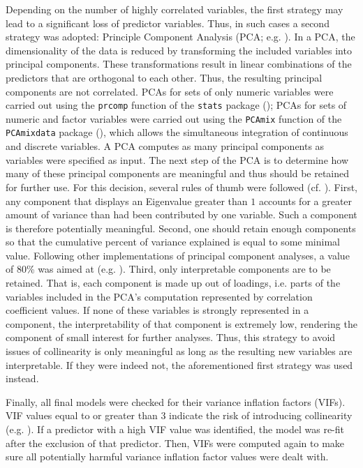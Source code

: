 Depending on the number of highly correlated variables, the first strategy may lead to a significant loss of predictor variables. Thus, in such cases a second strategy was adopted: Principle Component Analysis (PCA; e.g. \cite{Venables2002, Baayen2008, Tomaschek2018collin}). In a PCA, the dimensionality of the data is reduced by transforming the included variables into principal components. These transformations result in linear combinations of the predictors that are orthogonal to each other. Thus, the resulting principal components are not correlated. PCAs for sets of only numeric variables were carried out using the \texttt{prcomp} function of the \texttt{stats} package (\cite{RCore2020}); PCAs for sets of numeric and factor variables were carried out using the \texttt{PCAmix} function of the \texttt{PCAmixdata} package (\cite{Chavent2017}), which allows the simultaneous integration of continuous and discrete variables. A PCA computes as many principal components as variables were specified as input. The next step of the PCA is to determine how many of these principal components are meaningful and thus should be retained for further use. For this decision, several rules of thumb were followed (cf. \cite{ORourke2005, Baayen2008}). First, any component that displays an Eigenvalue greater than $1$ accounts for a greater amount of variance than had been contributed by one variable. Such a component is therefore potentially meaningful. Second, one should retain enough components so that the cumulative percent of variance explained is equal to some minimal value. Following other implementations of principal component analyses, a value of 80\% was aimed at (e.g. \cite{ORourke2005}). Third, only interpretable components are to be retained. That is, each component is made up out of loadings, i.e. parts of the variables included in the PCA’s computation represented by correlation coefficient values. If none of these variables is strongly represented in a component, the interpretability of that component is extremely low, rendering the component of small interest for further analyses. Thus, this strategy to avoid issues of collinearity is only meaningful as long as the resulting new variables are interpretable. If they were indeed not, the aforementioned first strategy was used instead.

Finally, all final models were checked for their variance inflation factors (VIFs). VIF values equal to or greater than $3$ indicate the risk of introducing collinearity (e.g. \cite{Zuur2010}). If a predictor with a high VIF value was identified, the model was re-fit after the exclusion of that predictor. Then, VIFs were computed again to make sure all potentially harmful variance inflation factor values were dealt with. 

